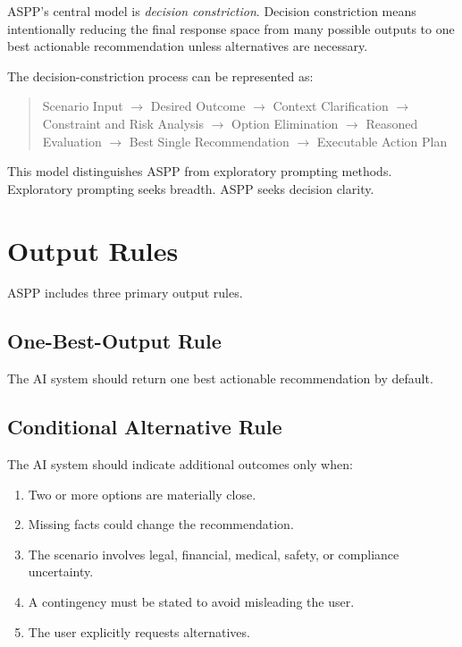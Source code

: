 \documentclass[11pt]{article}
\begin{document}
ASPP's central model is \textit{decision constriction}. Decision constriction means intentionally reducing the final response space from many possible outputs to one best actionable recommendation unless alternatives are necessary.

The decision-constriction process can be represented as:

\begin{quote}
Scenario Input $\rightarrow$ Desired Outcome $\rightarrow$ Context Clarification $\rightarrow$ Constraint and Risk Analysis $\rightarrow$ Option Elimination $\rightarrow$ Reasoned Evaluation $\rightarrow$ Best Single Recommendation $\rightarrow$ Executable Action Plan
\end{quote}

This model distinguishes ASPP from exploratory prompting methods. Exploratory prompting seeks breadth. ASPP seeks decision clarity.

\section{Output Rules}

ASPP includes three primary output rules.

\subsection{One-Best-Output Rule}

The AI system should return one best actionable recommendation by default.

\subsection{Conditional Alternative Rule}

The AI system should indicate additional outcomes only when:

\begin{enumerate}[leftmargin=*]
    \item Two or more options are materially close.
    \item Missing facts could change the recommendation.
    \item The scenario involves legal, financial, medical, safety, or compliance uncertainty.
    \item A contingency must be stated to avoid misleading the user.
    \item The user explicitly requests alternatives.
\end{enumerate}
\end{document}
